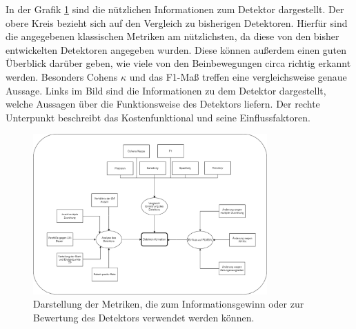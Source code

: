 In der Grafik \ref{fig:Metriken} sind die nützlichen Informationen zum Detektor dargestellt. Der obere Kreis bezieht sich auf den Vergleich zu bisherigen Detektoren. Hierfür sind die angegebenen klassischen Metriken am nützlichsten, da diese von den bisher entwickelten Detektoren angegeben wurden. Diese können außerdem einen guten Überblick darüber geben, wie viele von den Beinbewegungen circa richtig erkannt werden. Besonders Cohens $\kappa$ und das F1-Maß treffen eine vergleichsweise genaue Aussage.
Links im Bild sind die Informationen zu dem Detektor dargestellt, welche Aussagen über die Funktionsweise des Detektors liefern.
Der rechte Unterpunkt beschreibt das Kostenfunktional und seine Einflussfaktoren.
\begin{figure}[!ht]%
	\begin{center}
	\includegraphics[width=0.80\textwidth]{./Bilder/Metrik.png}
	\end{center}
	\caption{Darstellung der Metriken, die zum Informationsgewinn oder zur Bewertung des Detektors verwendet werden können.}%
	\label{fig:Metriken}%
\end{figure}